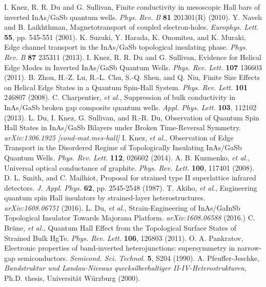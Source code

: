 \documentclass[titlepage,a4paper]{book}
\begin{document}
\begin{thebibliography}{99}
I. Knez, R. R. Du and G. Sullivan, Finite conductivity in mesoscopic Hall bars of inverted InAs/GaSb quantum wells. \textit{Phys. Rev. B} \textbf{81} 201301(R) (2010).
Y. Naveh and B. Laikhthman, Magnetotransport of coupled electron-holes. \textit{Europhys. Lett.} \textbf{55}, pp. 545-551 (2001).
K. Suzuki, Y. Harada, K. Onomitsu, and K. Muraki, Edge channel transport in the InAs/GaSb topological insulating phase. \textit{Phys. Rev. B} \textbf{87}  235311 (2013).
I. Knez, R. R. Du and G. Sullivan, Evidence for Helical Edge Modes in Inverted InAs/GaSb Quantum Wells. \textit{Phys. Rev. Lett.} \textbf{107} 136603 (2011).
B. Zhou, H.-Z. Lu, R.-L. Chu, S.-Q. Shen, and Q. Niu, Finite Size Effects on Helical Edge States in a Quantum Spin-Hall System. \textit{Phys. Rev. Lett.} \textbf{101} 246807 (2008).
C. Charpentier, \textit{et al.}, Suppression of bulk conductivity in InAs/GaSb broken gap composite quantum wells. \textit{Appl. Phys. Lett.} \textbf{103}, 112102 (2013).
L. Du, I. Knez, G. Sullivan, and R.-R. Du, Observation of Quantum Spin Hall States in InAs/GaSb Bilayers under Broken Time-Reversal Symmetry. \textit{arXiv:1306.1925 [cond-mat.mes-hall]}
 I. Knez, \textit{et al.}, Observation of Edge Transport in the Disordered Regime of Topologically Insulating InAs/GaSb Quantum Wells. \textit{Phys. Rev. Lett.} \textbf{112}, 026602 (2014).
A. B. Kuzmenko, \textit{et al.}, Universal optical conductance of graphite. \textit{Phys. Rev. Lett.} \textbf{100}, 117401 (2008).
D. L. Smith, and C. Mailhiot, Proposal for strained type II superlattice infrared detectors. \textit{J. Appl. Phys.} \textbf{62}, pp. 2545-2548 (1987). 
T. Akiho, \textit{et al.}, Engineering quantum spin Hall insulators by strained-layer heterostructures. \textit{arXiv:1608.06751} (2016).
L. Du, \textit{et al.}, Strain-Engineering of InAs/GaInSb Topological Insulator Towards Majorana Platform. \textit{arXiv:1608.06588} (2016.)
C. Brüne, \textit{et al.}, Quantum Hall Effect from the Topological Surface States of Strained Bulk HgTe. \textit{Phys. Rev. Lett.} \textbf{106}, 126803 (2011).
O. A. Pankratov, Electronic properties of band-inverted heterojunctions: supersymmetry in narrow-gap semiconductors. \textit{Semicond. Sci. Technol.} \textbf{5}, S204 (1990).
A. Pfeuffer-Jeschke, \textit{Bandstruktur und Landau-Niveaus quecksilberhaltiger II-IV-Heterostrukturen}, Ph.D. thesis, Universität Würzburg (2000).

\end{thebibliography}
\end{document}
